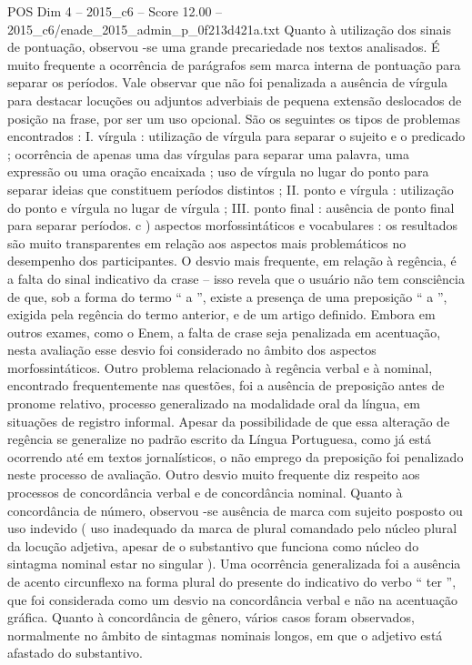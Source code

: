 \begin{textsample}{POS Dim 4 – 2015\_c6 – Score 12.00 – 2015\_c6/enade\_2015\_admin\_p\_0f213d421a.txt}
Quanto à utilização dos sinais de pontuação, observou -se uma grande precariedade nos textos analisados.
É muito frequente a ocorrência de parágrafos sem marca interna de pontuação para separar os períodos.
Vale observar que não foi penalizada a ausência de vírgula para destacar locuções ou adjuntos adverbiais de pequena extensão deslocados de posição na frase, por ser um uso opcional.
São os seguintes os tipos de problemas encontrados : I. vírgula : utilização de vírgula para separar o sujeito e o predicado ; ocorrência de apenas uma das vírgulas para separar uma palavra, uma expressão ou uma oração encaixada ; uso de vírgula no lugar do ponto para separar ideias que constituem períodos distintos ; II. ponto e vírgula : utilização do ponto e vírgula no lugar de vírgula ; III. ponto final : ausência de ponto final para separar períodos. c ) aspectos morfossintáticos e vocabulares : os resultados são muito transparentes em relação aos aspectos mais problemáticos no desempenho dos participantes.
O desvio mais frequente, em relação à regência, é a falta do sinal indicativo da crase – isso revela que o usuário não tem consciência de que, sob a forma do termo “ a ”, existe a presença de uma preposição “ a ”, exigida pela regência do termo anterior, e de um artigo definido.
Embora em outros exames, como o Enem, a falta de crase seja penalizada em acentuação, nesta avaliação esse desvio foi considerado no âmbito dos aspectos morfossintáticos.
Outro problema relacionado à regência verbal e à nominal, encontrado frequentemente nas questões, foi a ausência de preposição antes de pronome relativo, processo generalizado na modalidade oral da língua, em situações de registro informal.
Apesar da possibilidade de que essa alteração de regência se generalize no padrão escrito da Língua Portuguesa, como já está ocorrendo até em textos jornalísticos, o não emprego da preposição foi penalizado neste processo de avaliação.
Outro desvio muito frequente diz respeito aos processos de concordância verbal e de concordância nominal.
Quanto à concordância de número, observou -se ausência de marca com sujeito posposto ou uso indevido ( uso inadequado da marca de plural comandado pelo núcleo plural da locução adjetiva, apesar de o substantivo que funciona como núcleo do sintagma nominal estar no singular ).
Uma ocorrência generalizada foi a ausência de acento circunflexo na forma plural do presente do indicativo do verbo “ ter ”, que foi considerada como um desvio na concordância verbal e não na acentuação gráfica.
Quanto à concordância de gênero, vários casos foram observados, normalmente no âmbito de sintagmas nominais longos, em que o adjetivo está afastado do substantivo.

\end{textsample}
